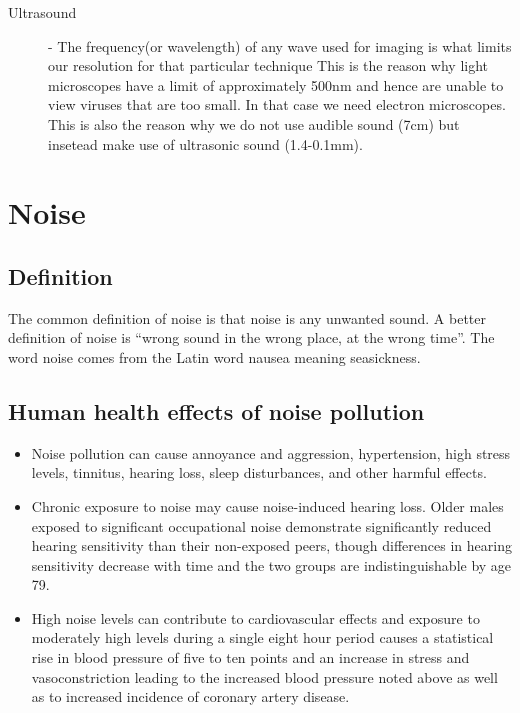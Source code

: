 \documentclass[12pt]{book}
\begin{document}
\begin{tcolorbox}[colback=red!5!white,colframe=red!50!black,title= Additional Information]
  \begin{description}
      \item[Ultrasound] -  The frequency(or wavelength)  of any wave used for imaging is what limits our resolution for that  particular technique This is the reason why light microscopes have a limit of approximately 500nm and hence are unable to view viruses that are too small. In that case we need electron microscopes. This is also the reason why we do not use audible sound (7cm) but insetead make use  of ultrasonic sound (1.4-0.1mm).

  \end{description}
\end{tcolorbox}

\chapter{Noise}
\section*{Definition}
The common definition of noise is that noise is any unwanted sound.  A better definition of noise is “wrong sound in the
wrong place, at the wrong time”.  The word noise comes from the Latin word nausea meaning seasickness.
\section*{Human health effects of noise pollution}
\begin{itemize}
\item Noise pollution can cause
annoyance and aggression, hypertension, high stress levels, tinnitus,
hearing loss, sleep disturbances, and other harmful effects.
\item Chronic exposure to noise may cause noise-induced hearing loss.
Older males exposed to significant occupational noise demonstrate
significantly reduced hearing sensitivity than their non-exposed peers,
though differences in hearing sensitivity decrease with time and the
two groups are indistinguishable by age 79.
\item High noise levels can contribute to cardiovascular effects and
exposure to moderately high levels during a single eight hour period
causes a statistical rise in blood pressure of five to ten points and
an increase in stress and vasoconstriction leading to the increased
blood pressure noted above as well as to increased incidence of
coronary artery disease.
\end{itemize}
\end{document}

